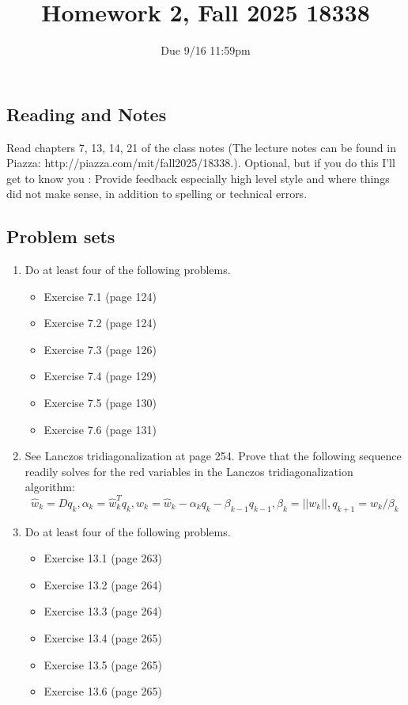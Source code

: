 \documentclass{article}
\title{Homework 2, Fall 2025 18338}
\author{Due 9/16 11:59pm}
\date{}
\begin{document}
\maketitle


\subsection*{Reading and Notes}

Read chapters 7, 13, 14, 21 of the class notes
(The lecture notes  can be found in Piazza: http://piazza.com/mit/fall2025/18338.). 
Optional, but if you do this I'll get to know you : Provide  feedback especially high level style and where things did not make sense, in addition to spelling or technical errors.


\subsection*{Problem sets}
\begin{enumerate}
	\item Do at least four of the following problems. 
\begin{itemize}
\item Exercise 7.1 (page 124)
\item Exercise 7.2 (page 124)
\item Exercise 7.3 (page 126)
\item Exercise 7.4 (page 129)
\item Exercise 7.5 (page 130)
\item Exercise 7.6 (page 131)
\end{itemize}
\item See Lanczos tridiagonalization at page 254. Prove that the following sequence readily solves for the red variables in the Lanczos tridiagonalization algorithm:
\begin{equation*}
\hat{w}_k = Dq_k, \alpha_k = \hat{w}_k^T q_k, w_k = \hat{w}_k - \alpha_k q_k - \beta_{k-1}q_{k-1}, \beta_k = ||w_k||, q_{k+1} = w_k/\beta_k
\end{equation*}
\item Do at least four of the following problems. 

\begin{itemize}
\item Exercise 13.1 (page 263)
\item Exercise 13.2 (page 264)
\item Exercise 13.3 (page 264)
\item Exercise 13.4 (page 265)
\item Exercise 13.5 (page 265)
\item Exercise 13.6 (page 265)
\end{itemize}



\end{enumerate}
\end{document}
